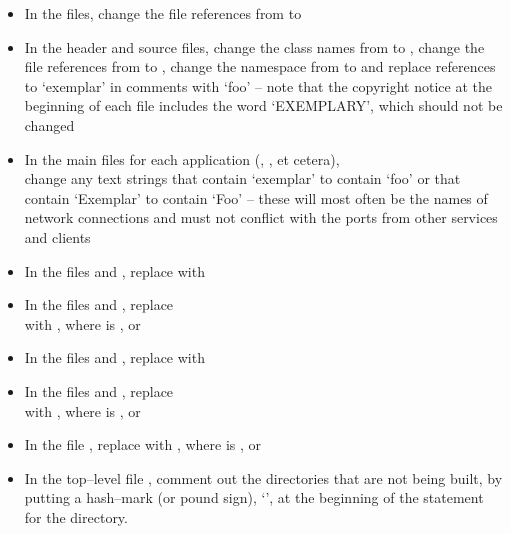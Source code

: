 \begin{itemize}
\item In the  files, change the file references from
 to 
\item In the  header and source files, change the class names from
 to , change the file references from
 to , change the namespace from
 to  and replace references to `exemplar' in comments with
`foo' -- note that the copyright notice at the beginning of each file includes the word
`EXEMPLARY', which should not be changed
\item In the main files for each application (,
, et cetera),\\
change any text strings that contain `exemplar' to contain `foo' or that contain
`Exemplar' to contain `Foo' -- these will most often be the names of \yarp{} network
connections and must not conflict with the ports from other services and clients
\item In the files  and , replace
 with
\item In the files  and
, replace\\
 with
,
where  is ,  or 
\item In the files  and , replace
with 
\item In the files  and ,
replace\\
with ,
where  is ,  or 
\item In the file , replace
 with ,
where  is ,  or 
\item In the top--level file , comment out the directories that are
not being built, by putting a hash--mark (or pound sign), `\asCode{\#}', at the beginning
of the  statement for the directory.
\end{itemize}
